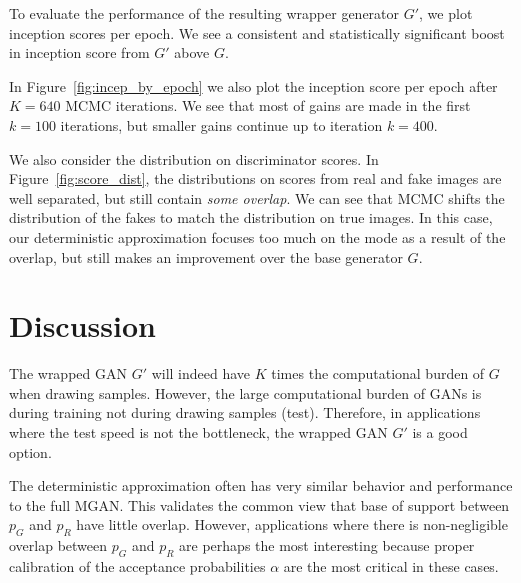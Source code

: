 \documentclass{article}
\newcommand{\PG}{{p_G}}
\newcommand{\PR}{{p_R}}
\newcommand{\accept}{\alpha}
\begin{document}
To evaluate the performance of the resulting wrapper generator $G'$, we plot inception scores per epoch.
We see a consistent and statistically significant boost in inception score from $G'$ above $G$.

In Figure~\ref{fig:incep_by_epoch} we also plot the inception score per epoch after $K=640$ MCMC iterations.
We see that most of gains are made in the first $k=100$ iterations, but smaller gains continue up to iteration $k=400$.

We also consider the distribution on discriminator scores.
In Figure~\ref{fig:score_dist}, the distributions on scores from real and fake images are well separated, but still contain \emph{some overlap}.
We can see that MCMC shifts the distribution of the fakes to match the distribution on true images.
In this case, our deterministic approximation focuses too much on the mode as a result of the overlap, but still makes an improvement over the base generator $G$.


\section{Discussion}

The wrapped GAN $G'$ will indeed have $K$ times the computational burden of $G$ when drawing samples.
However, the large computational burden of GANs is during training not during drawing samples (test)\@.
Therefore, in applications where the test speed is not the bottleneck, the wrapped GAN $G'$ is a good option.

The deterministic approximation often has very similar behavior and performance to the full MGAN\@.
This validates the common view that base of support between $\PG$ and $\PR$ have little overlap.
However, applications where there is non-negligible overlap between $\PG$ and $\PR$ are perhaps the most interesting because proper calibration of the acceptance probabilities $\accept$ are the most critical in these cases.
\end{document}
